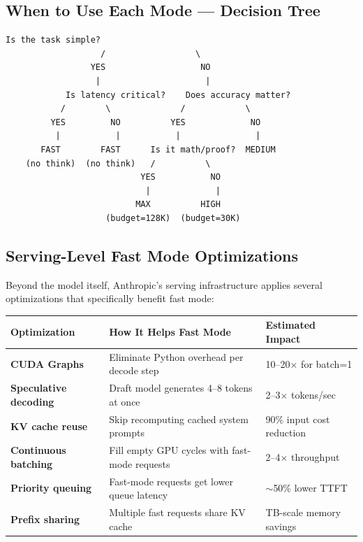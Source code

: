 \documentclass[11pt,a4paper]{article}
\begin{document}
\subsection{When to Use Each Mode --- Decision Tree}

\begin{lstlisting}[basicstyle=\ttfamily\small, caption={Fast Mode Decision Tree}]
                    Is the task simple?
                   /                  \
                 YES                   NO
                  |                     |
            Is latency critical?    Does accuracy matter?
           /        \              /            \
         YES         NO          YES             NO
          |           |           |               |
       FAST        FAST      Is it math/proof?  MEDIUM
    (no think)  (no think)   /          \
                           YES           NO
                            |             |
                          MAX          HIGH
                    (budget=128K)  (budget=30K)
\end{lstlisting}

\subsection{Serving-Level Fast Mode Optimizations}

Beyond the model itself, Anthropic's serving infrastructure applies several optimizations that specifically benefit fast mode:

\begin{center}
\begin{tabular}{lL{4cm}L{5cm}}
\toprule
\textbf{Optimization} & \textbf{How It Helps Fast Mode} & \textbf{Estimated Impact} \\
\midrule
\textbf{CUDA Graphs} & Eliminate Python overhead per decode step & 10--20$\times$ for batch=1 \\
\textbf{Speculative decoding} & Draft model generates 4--8 tokens at once & 2--3$\times$ tokens/sec \\
\textbf{KV cache reuse} & Skip recomputing cached system prompts & 90\% input cost reduction \\
\textbf{Continuous batching} & Fill empty GPU cycles with fast-mode requests & 2--4$\times$ throughput \\
\textbf{Priority queuing} & Fast-mode requests get lower queue latency & $\sim$50\% lower TTFT \\
\textbf{Prefix sharing} & Multiple fast requests share KV cache & TB-scale memory savings \\
\bottomrule
\end{tabular}
\end{center}
\end{document}
